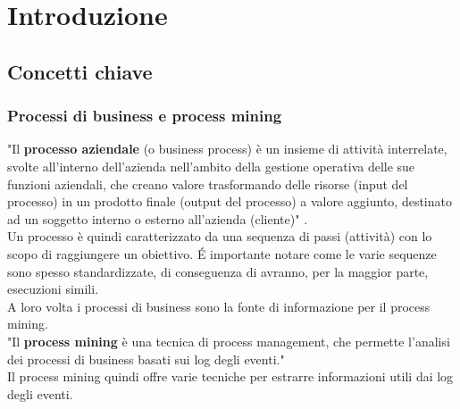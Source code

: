 
\chapter{Introduzione}
\label{cap:introduzione}

%
%
%


\section{Concetti chiave}
\subsection{Processi di business e process mining}
"Il \textbf{processo aziendale} (o business process) è un insieme di attività interrelate, svolte all'interno dell'azienda nell'ambito della gestione operativa delle sue funzioni aziendali, che creano valore trasformando delle risorse (input del processo) in un prodotto finale (output del processo) a valore aggiunto, destinato ad un soggetto interno o esterno all'azienda (cliente)" \cite{site:wiki-business-process}.
\\ 
Un processo è quindi caratterizzato da una sequenza di passi (attività) con lo scopo di raggiungere un obiettivo. \'E importante notare come le varie sequenze sono spesso standardizzate, di conseguenza di avranno, per la maggior parte, esecuzioni simili.
\\ 
A loro volta i processi di business sono la fonte di informazione per il process mining. 
\\
"Il \textbf{process mining} è una tecnica di process management, che permette l'analisi dei processi di business basati sui log degli eventi." \cite{site:wiki-process-mining}
\\
Il process mining quindi offre varie tecniche per estrarre informazioni utili dai log degli eventi. 
